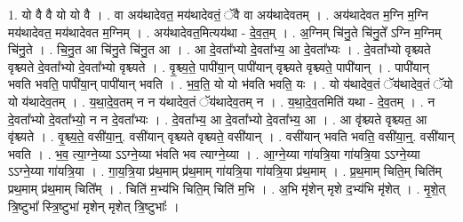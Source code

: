 \documentclass[17pt]{extarticle}
\begin{document}
1. यो वै वै यो यो वै । . वा अय॑थादेवत॒ मय॑थादेवतं॒ ॅवै वा अय॑थादेवतम् । . अय॑थादेवत म॒ग्नि म॒ग्नि मय॑थादेवत॒ मय॑थादेवत म॒ग्निम् । . अय॑थादेवत॒मित्यय॑था - दे॒व॒त॒म् । . अ॒ग्निम् चि॑नु॒ते चि॑नु॒ते᳚ ऽग्नि म॒ग्निम् चि॑नु॒ते । . चि॒नु॒त आ चि॑नु॒ते चि॑नु॒त आ । . आ दे॒वता᳚भ्यो दे॒वता᳚भ्य॒ आ दे॒वता᳚भ्यः । . दे॒वता᳚भ्यो वृश्च्यते वृश्च्यते दे॒वता᳚भ्यो दे॒वता᳚भ्यो वृश्च्यते । . वृ॒श्च्य॒ते॒ पापी॑या॒न् पापी॑यान् वृश्च्यते वृश्च्यते॒ पापी॑यान् । . पापी॑यान् भवति भवति॒ पापी॑या॒न् पापी॑यान् भवति । . भ॒व॒ति॒ यो यो भ॑वति भवति॒ यः । . यो य॑थादेव॒तं ॅय॑थादेव॒तं ॅयो यो य॑थादेव॒तम् । . य॒था॒दे॒व॒तम् न न य॑थादेव॒तं ॅय॑थादेव॒तम् न । . य॒था॒दे॒व॒तमिति॑ यथा - दे॒व॒तम् । . न दे॒वता᳚भ्यो दे॒वता᳚भ्यो॒ न न दे॒वता᳚भ्यः । . दे॒वता᳚भ्य॒ आ दे॒वता᳚भ्यो दे॒वता᳚भ्य॒ आ । . आ वृ॑श्च्यते वृश्च्यत॒ आ वृ॑श्च्यते । . वृ॒श्च्य॒ते॒ वसी॑या॒न्॒. वसी॑यान् वृश्च्यते वृश्च्यते॒ वसी॑यान् । . वसी॑यान् भवति भवति॒ वसी॑या॒न्॒. वसी॑यान् भवति । . भ॒व॒ त्या॒ग्ने॒य्या ऽऽग्ने॒य्या भ॑वति भव त्याग्ने॒य्या । . आ॒ग्ने॒य्या गा॑यत्रि॒या गा॑यत्रि॒या ऽऽग्ने॒य्या ऽऽग्ने॒य्या गा॑यत्रि॒या । . गा॒य॒त्रि॒या प्र॑थ॒माम् प्र॑थ॒माम् गा॑यत्रि॒या गा॑यत्रि॒या प्र॑थ॒माम् । . प्र॒थ॒माम् चिति॒म् चिति॑म् प्रथ॒माम् प्र॑थ॒माम् चिति᳚म् । . चिति॑ म॒भ्य॑भि चिति॒म् चिति॑ म॒भि । . अ॒भि मृ॑शेन् मृशे द॒भ्य॑भि मृ॑शेत् । . मृ॒शे॒त् त्रि॒ष्टुभा᳚ स्त्रि॒ष्टुभा॑ मृशेन् मृशेत् त्रि॒ष्टुभाः᳚ । \newline
\end{document}
